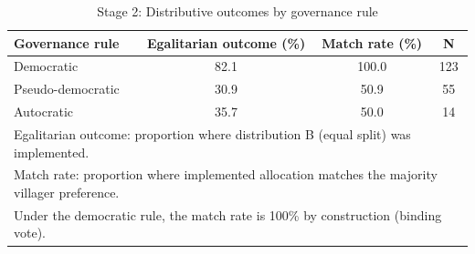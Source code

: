 \begin{table}[htbp]\centering
\caption{Stage 2: Distributive outcomes by governance rule}
\begin{tabular}{lccc}
\toprule
Governance rule & Egalitarian outcome (\%) & Match rate (\%) & N \\
\midrule
Democratic & 82.1 & 100.0 &  123 \\
Pseudo-democratic & 30.9 & 50.9 &   55 \\
Autocratic & 35.7 & 50.0 &   14 \\
\bottomrule
\multicolumn{4}{l}{\footnotesize Egalitarian outcome: proportion where distribution B (equal split) was implemented.} \\
\multicolumn{4}{l}{\footnotesize Match rate: proportion where implemented allocation matches the majority villager preference.} \\
\multicolumn{4}{l}{\footnotesize Under the democratic rule, the match rate is 100\% by construction (binding vote).} \\
\end{tabular}
\end{table}
